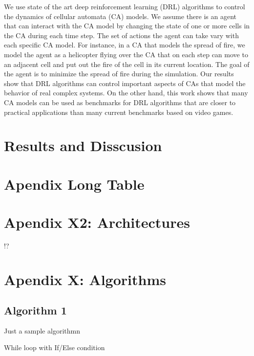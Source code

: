 \documentclass[
]{book}
\begin{document}
We use state of the art deep reinforcement learning (DRL) algorithms to control the dynamics of
cellular automata (CA) models. We assume there is an agent that can interact with the CA model by
changing the state of one or more cells in the CA during each time step. The set of actions the agent
can take vary with each specific CA model. For instance, in a CA that models the spread of fire, we
model the agent as a helicopter flying over the CA that on each step can move to an adjacent cell and
put out the fire of the cell in its current location. The goal of the agent is to minimize the spread of
fire during the simulation. Our results show that DRL algorithms can control important aspects of
CAs that model the behavior of real complex systems. On the other hand, this work shows that many
CA models can be used as benchmarks for DRL algorithms that are closer to practical applications
than many current benchmarks based on video games.

\hypertarget{results-and-disscusion-1}{%
\section{Results and Disscusion}\label{results-and-disscusion-1}}

\hypertarget{apendix-long-table}{%
\section{Apendix Long Table}\label{apendix-long-table}}

\hypertarget{apendix-x2-architectures}{%
\section{Apendix X2: Architectures}\label{apendix-x2-architectures}}

!?

\hypertarget{apendix-x-algorithms}{%
\section{Apendix X: Algorithms}\label{apendix-x-algorithms}}

\hypertarget{algorithm-1}{%
\subsection{Algorithm 1}\label{algorithm-1}}

Just a sample algorithmn

\begin{algorithm}[H]
\DontPrintSemicolon
\SetAlgoLined
{}
\BlankLine
{}
\caption{While loop with If/Else condition}
\end{algorithm}
\end{document}
